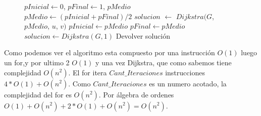 \begin{center}
 \begin{figure}[H]
  \begin{pseudo}
    \State $pInicial \leftarrow 0$, $pFinal \leftarrow 1$, $pMedio$ 
      \State $pMedio \leftarrow (pInicial + pFinal)/2$ 
      \State $solucion$ $\leftarrow$ $Dijkstra(G$, $pMedio$, $u$, $v)$ 
       
	 \State $pInicial \leftarrow pMedio$ 
      \Else
	 \State $pFinal \leftarrow pMedio$ 
      \EndIf
    \EndFor
     
      \State $solucion \leftarrow Dijkstra(G, 1)$ 
    \EndIf
    \State Devolver solución 
   \EndProcedure
  \end{pseudo}
 \end{figure}
\end{center}

 Como podemos ver el algoritmo esta compuesto por una instrucción $O(1)$ luego un for,y por ultimo 2 $O(1)$ y una vez Dijkstra, que como sabemos tiene complejidad $O(n^2)$. El for itera $Cant\_Iteraciones$ instrucciones $4*O(1) + O(n^2)$. Como $Cant\_Iteraciones$ es un numero acotado, la complejidad del for es $O(n^2)$. Por álgebra de ordenes $O(1)+O(n^2)+2*O(1)+O(n^2)=O(n^2)$.  